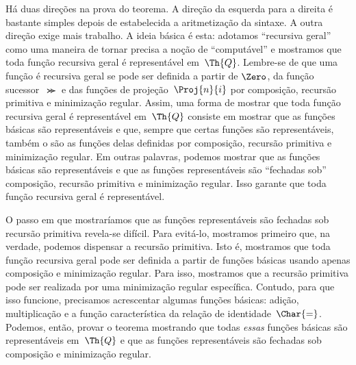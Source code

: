 \documentclass[../../../include/open-logic-section]{subfiles}
\begin{document}
Há duas direções na prova do teorema. A direção da esquerda para a
direita é bastante simples depois de estabelecida a aritmetização da
sintaxe. A outra direção exige mais trabalho. A ideia básica é esta:
adotamos ``recursiva geral'' como uma maneira de tornar precisa a noção
de ``computável'' e mostramos que toda função recursiva geral é
representável em~$\Th{Q}$. Lembre-se de que uma função é recursiva geral
se pode ser definida a partir de $\Zero$, da função sucessor~$\Succ$ e
das funções de projeção~$\Proj{n}{i}$ por composição, recursão primitiva
e minimização regular. Assim, uma forma de mostrar que toda função
recursiva geral é representável em~$\Th{Q}$ consiste em mostrar que as
funções básicas são representáveis e que, sempre que certas funções
são representáveis, também o são as funções delas definidas por
composição, recursão primitiva e minimização regular. Em outras
palavras, podemos mostrar que as funções básicas são representáveis e
que as funções representáveis são ``fechadas sob'' composição,
recursão primitiva e minimização regular. Isso garante que toda função
recursiva geral é representável.

O passo em que mostraríamos que as funções representáveis são fechadas
sob recursão primitiva revela-se difícil. Para evitá-lo, mostramos
primeiro que, na verdade, podemos dispensar a recursão primitiva. Isto
é, mostramos que toda função recursiva geral pode ser definida a partir
de funções básicas usando apenas composição e minimização regular. Para
isso, mostramos que a recursão primitiva pode ser realizada por uma
minimização regular específica. Contudo, para que isso funcione,
precisamos acrescentar algumas funções básicas: adição, multiplicação e
a função característica da relação de identidade~$\Char{=}$. Podemos,
então, provar o teorema mostrando que todas \emph{essas} funções
básicas são representáveis em~$\Th{Q}$ e que as funções representáveis
são fechadas sob composição e minimização regular.
\end{document}
